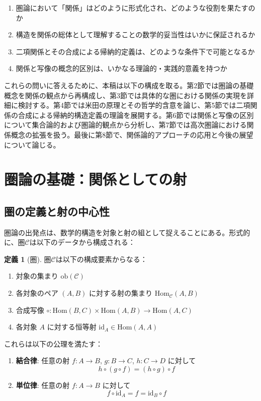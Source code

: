 \documentclass[11pt,a4paper,twocolumn]{ltjsarticle}
\theoremstyle{definition}
\newtheorem{definition}{定義}[section]
\theoremstyle{plain}
\newcommand{\Hom}{\mathrm{Hom}}
\newcommand{\ob}{\mathrm{ob}}
\newcommand{\id}{\mathrm{id}}
\begin{document}
\begin{enumerate}
\item 圏論において「関係」はどのように形式化され、どのような役割を果たすのか
\item 構造を関係の総体として理解することの数学的妥当性はいかに保証されるか
\item 二項関係とその合成による帰納的定義は、どのような条件下で可能となるか
\item 関係と写像の概念的区別は、いかなる理論的・実践的意義を持つか
\end{enumerate}

これらの問いに答えるために、本稿は以下の構成を取る。第2節では圏論の基礎概念を関係の観点から再構成し、第3節では具体的な圏における関係の実現を詳細に検討する。第4節では米田の原理とその哲学的含意を論じ、第5節では二項関係の合成による帰納的構造定義の理論を展開する。第6節では関係と写像の区別について集合論的および圏論的観点から分析し、第7節では高次圏論における関係概念の拡張を扱う。最後に第8節で、関係論的アプローチの応用と今後の展望について論じる。

\section{圏論の基礎：関係としての射}

\subsection{圏の定義と射の中心性}

圏論の出発点は、数学的構造を対象と射の組として捉えることにある。形式的に、圏$\mathcal{C}$は以下のデータから構成される：

\begin{definition}[圏]
圏$\mathcal{C}$は以下の構成要素からなる：
\begin{enumerate}
\item 対象の集まり $\ob(\mathcal{C})$
\item 各対象のペア $(A, B)$ に対する射の集まり $\Hom_{\mathcal{C}}(A, B)$
\item 合成写像 $\circ: \Hom(B, C) \times \Hom(A, B) \rightarrow \Hom(A, C)$
\item 各対象 $A$ に対する恒等射 $\id_A \in \Hom(A, A)$
\end{enumerate}
これらは以下の公理を満たす：
\begin{enumerate}[label=(\roman*)]
\item \textbf{結合律}: 任意の射 $f: A \to B$, $g: B \to C$, $h: C \to D$ に対して
\[
h \circ (g \circ f) = (h \circ g) \circ f
\]
\item \textbf{単位律}: 任意の射 $f: A \to B$ に対して
\[
f \circ \id_A = f = \id_B \circ f
\]
\end{enumerate}
\end{definition}
\end{document}
